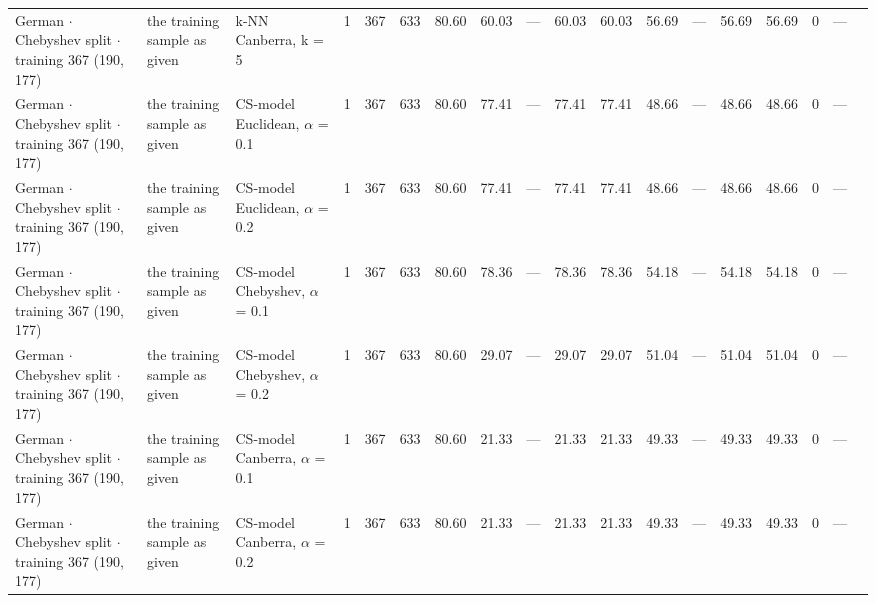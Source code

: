 \begin{longtable}{lllrrrrrrrrrrrrrrl}
  German $\cdot$ Chebyshev split $\cdot$ training 367 (190, 177) & the training sample as given & k-NN Canberra, k = 5 & 1 & 367 & 633 & 80.60 & 60.03 & --- & 60.03 & 60.03 & 56.69 & --- & 56.69 & 56.69 & 0 & --- &  \\
  German $\cdot$ Chebyshev split $\cdot$ training 367 (190, 177) & the training sample as given & CS-model Euclidean, $\alpha$ = 0.1 & 1 & 367 & 633 & 80.60 & 77.41 & --- & 77.41 & 77.41 & 48.66 & --- & 48.66 & 48.66 & 0 & --- &  \\
  German $\cdot$ Chebyshev split $\cdot$ training 367 (190, 177) & the training sample as given & CS-model Euclidean, $\alpha$ = 0.2 & 1 & 367 & 633 & 80.60 & 77.41 & --- & 77.41 & 77.41 & 48.66 & --- & 48.66 & 48.66 & 0 & --- &  \\
  German $\cdot$ Chebyshev split $\cdot$ training 367 (190, 177) & the training sample as given & CS-model Chebyshev, $\alpha$ = 0.1 & 1 & 367 & 633 & 80.60 & 78.36 & --- & 78.36 & 78.36 & 54.18 & --- & 54.18 & 54.18 & 0 & --- &  \\
  German $\cdot$ Chebyshev split $\cdot$ training 367 (190, 177) & the training sample as given & CS-model Chebyshev, $\alpha$ = 0.2 & 1 & 367 & 633 & 80.60 & 29.07 & --- & 29.07 & 29.07 & 51.04 & --- & 51.04 & 51.04 & 0 & --- &  \\
  German $\cdot$ Chebyshev split $\cdot$ training 367 (190, 177) & the training sample as given & CS-model Canberra, $\alpha$ = 0.1 & 1 & 367 & 633 & 80.60 & 21.33 & --- & 21.33 & 21.33 & 49.33 & --- & 49.33 & 49.33 & 0 & --- &  \\
  German $\cdot$ Chebyshev split $\cdot$ training 367 (190, 177) & the training sample as given & CS-model Canberra, $\alpha$ = 0.2 & 1 & 367 & 633 & 80.60 & 21.33 & --- & 21.33 & 21.33 & 49.33 & --- & 49.33 & 49.33 & 0 & --- &  \\
\end{longtable}
